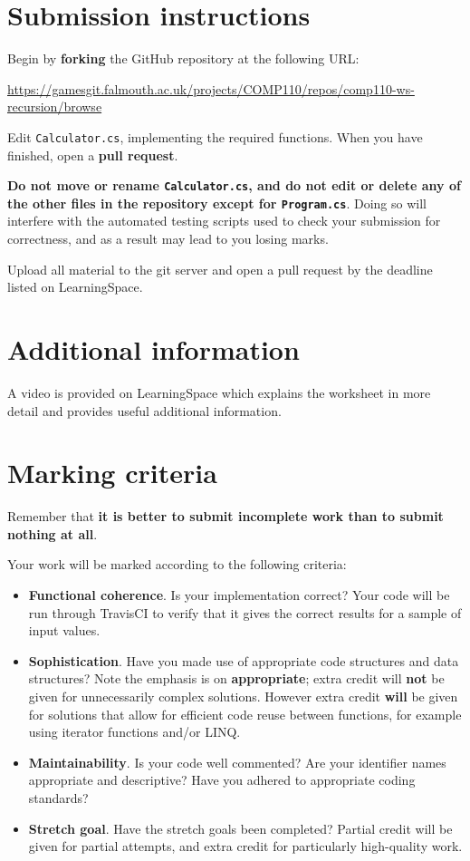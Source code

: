 \documentclass{../../../fal_assignment}
\begin{document}
\section*{Submission instructions}

Begin by \textbf{forking} the GitHub repository at the following URL:

\url{https://gamesgit.falmouth.ac.uk/projects/COMP110/repos/comp110-ws-recursion/browse}

Edit \texttt{Calculator.cs}, implementing the required functions.
When you have finished, open a \textbf{pull request}.

\textbf{Do not move or rename \texttt{Calculator.cs}, and do not edit or delete any of the other files in the repository except for \texttt{Program.cs}}.
Doing so will interfere with the automated testing scripts used to check your submission for correctness,
and as a result may lead to you losing marks.

Upload all material to the git server and open a pull request by the deadline listed on LearningSpace.

\section*{Additional information}

A video is provided on LearningSpace which explains the worksheet in more detail and provides useful additional information.

\section*{Marking criteria}

Remember that \textbf{it is better to submit incomplete work than to submit nothing at all}.

Your work will be marked according to the following criteria:
\begin{itemize}
	\item \textbf{Functional coherence}. Is your implementation correct?
		Your code will be run through TravisCI to verify that it gives the correct results for a sample of input values.
	\item \textbf{Sophistication}. Have you made use of appropriate code structures and data structures?
		Note the emphasis is on \textbf{appropriate}; extra credit will \textbf{not} be given for unnecessarily complex solutions.
		However extra credit \textbf{will} be given for solutions that allow for efficient code reuse between functions,
		for example using iterator functions and/or LINQ.
	\item \textbf{Maintainability}. Is your code well commented? Are your identifier names appropriate and descriptive?
		Have you adhered to appropriate coding standards?
	\item \textbf{Stretch goal}. Have the stretch goals been completed? Partial credit will be given for partial attempts,
		and extra credit for particularly high-quality work.
\end{itemize}
\end{document}

